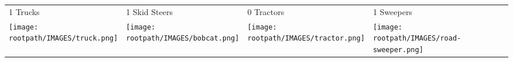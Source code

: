 \begin{tabular}{m{}m{}m{}m{}}
    {\color{ccorange} 1 Trucks} & {\color{ccorange} 1 Skid Steers} & {\color{ccorange} 0 Tractors} & {\color{ccorange} 1 Sweepers} \\
    \texttt{[image: \\rootpath/IMAGES/truck.png]}  & \texttt{[image: \\rootpath/IMAGES/bobcat.png]} & \texttt{[image: \\rootpath/IMAGES/tractor.png]} & \texttt{[image: \\rootpath/IMAGES/road-sweeper.png]}                         
    \end{tabular}